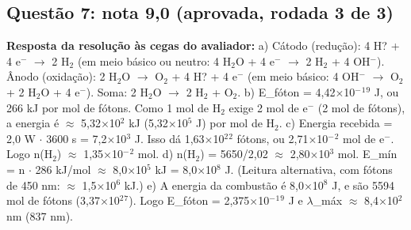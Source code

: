 \documentclass{article}%
\begin{document}
\subsection*{Questão 7: nota 9,0 (aprovada, rodada 3 de 3)}%
\textbf{Resposta da resolução às cegas do avaliador:} a) Cátodo (redução): 4 H? + 4 e$^{-}$ $\to$ 2 H$_{2}$ (em meio básico ou neutro: 4 H$_{2}$O + 4 e$^{-}$ $\to$ 2 H$_{2}$ + 4 OH$^{-}$). Ânodo (oxidação): 2 H$_{2}$O $\to$ O$_{2}$ + 4 H? + 4 e$^{-}$ (em meio básico: 4 OH$^{-}$ $\to$ O$_{2}$ + 2 H$_{2}$O + 4 e$^{-}$). Soma: 2 H$_{2}$O $\to$ 2 H$_{2}$ + O$_{2}$.\newline%
b) E\_fóton = 4,42$\times$10$^{-}$$^{1}$$^{9}$ J, ou 266 kJ por mol de fótons. Como 1 mol de H$_{2}$ exige 2 mol de e$^{-}$ (2 mol de fótons), a energia é $\approx$ 5,32$\times$10$^2$ kJ (5,32$\times$10$^{5}$ J) por mol de H$_{2}$.\newline%
c) Energia recebida = 2,0 W $\cdot$ 3600 s = 7,2$\times$10$^3$ J. Isso dá 1,63$\times$10$^2$$^2$ fótons, ou 2,71$\times$10$^{-}$$^2$ mol de e$^{-}$. Logo n(H$_{2}$) $\approx$ 1,35$\times$10$^{-}$$^2$ mol.\newline%
d) n(H$_{2}$) = 5650/2,02 $\approx$ 2,80$\times$10$^3$ mol. E\_mín = n $\cdot$ 286 kJ/mol $\approx$ 8,0$\times$10$^{5}$ kJ = 8,0$\times$10$^{8}$ J. (Leitura alternativa, com fótons de 450 nm: $\approx$ 1,5$\times$10$^{6}$ kJ.)\newline%
e) A energia da combustão é 8,0$\times$10$^{8}$ J, e são 5594 mol de fótons (3,37$\times$10$^2$$^{7}$). Logo E\_fóton = 2,375$\times$10$^{-}$$^{1}$$^{9}$ J e $\lambda$\_máx $\approx$ 8,4$\times$10$^2$ nm (837 nm).\par %
\end{document}
